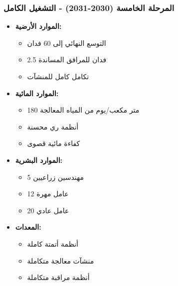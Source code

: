 \subsubsection{المرحلة الخامسة (2030-2031) - التشغيل الكامل}
\begin{itemize}
    \item \textbf{الموارد الأرضية:}
    \begin{itemize}
        \item التوسع النهائي إلى 60 فدان
        \item 2.5 فدان للمرافق المساندة
        \item تكامل كامل للمنشآت
    \end{itemize}
    \item \textbf{الموارد المائية:}
    \begin{itemize}
        \item 180 متر مكعب/يوم من المياه المعالجة
        \item أنظمة ري محسنة
        \item كفاءة مائية قصوى
    \end{itemize}
    \item \textbf{الموارد البشرية:}
    \begin{itemize}
        \item 5 مهندسين زراعيين
        \item 12 عامل مهرة
        \item 20 عامل عادي
    \end{itemize}
    \item \textbf{المعدات:}
    \begin{itemize}
        \item أنظمة أتمتة كاملة
        \item منشآت معالجة متكاملة
        \item أنظمة مراقبة متكاملة
    \end{itemize}
\end{itemize}

